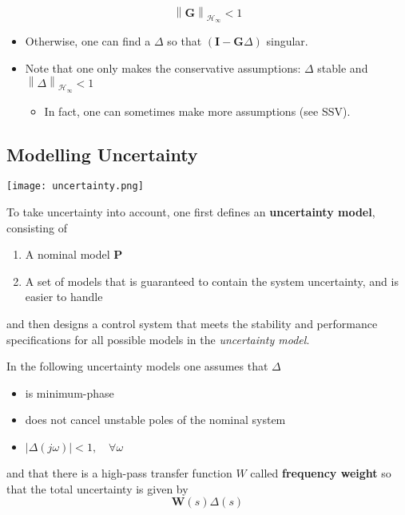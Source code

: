 \begin{equation*}
    {\left\|\mathbf{G}\right\|}_{\mathcal{H}_{\infty}}<1
\end{equation*}
\begin{itemize}
    \item Otherwise, one can find a $\Delta$ so that $(\mathbf{I}-\mathbf{G}\Delta)$ singular.
    \item Note that one only makes the conservative assumptions: $\Delta$ stable and $\left\|\Delta\right\|_{\mathcal{H}_\infty}<1$
          \begin{itemize}
              \item In fact, one can sometimes make more assumptions (see SSV).
          \end{itemize}
\end{itemize}

\subsection{Modelling Uncertainty}
\begin{center}
    \texttt{[image: uncertainty.png]}
\end{center}
To take uncertainty into account, one first defines an \textbf{uncertainty model}, consisting of
\begin{enumerate}
    \item A nominal model $\mathbf{P}$
    \item A set of models that is guaranteed to contain the system uncertainty, and is easier to handle
\end{enumerate}
and then designs a control system that meets the stability and performance specifications for all possible models in the \textit{uncertainty model}.

\newpar{}

In the following uncertainty models one assumes that $\Delta$
\begin{itemize}
    \item is minimum-phase
    \item does not cancel unstable poles of the nominal system
    \item $|\Delta(j\omega)|<1,\quad\forall\omega$
\end{itemize}
and that there is a high-pass transfer function $W$ called \textbf{frequency weight} so that the total uncertainty is given by
\begin{equation*}
    \mathbf{W}(s)\Delta(s)
\end{equation*}

